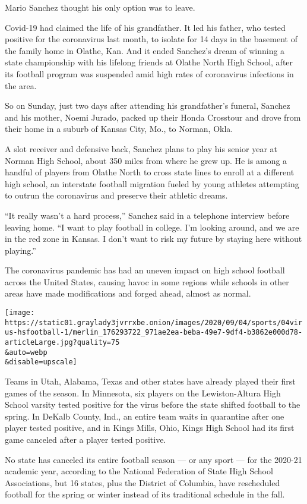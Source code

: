 Mario Sanchez thought his only option was to leave.

Covid-19 had claimed the life of his grandfather. It led his father, who
tested positive for the coronavirus last month, to isolate for 14 days
in the basement of the family home in Olathe, Kan. And it ended
Sanchez's dream of winning a state championship with his lifelong
friends at Olathe North High School, after its football program was
suspended amid high rates of coronavirus infections in the area.

So on Sunday, just two days after attending his grandfather's funeral,
Sanchez and his mother, Noemi Jurado, packed up their Honda Crosstour
and drove from their home in a suburb of Kansas City, Mo., to Norman,
Okla.

A slot receiver and defensive back, Sanchez plans to play his senior
year at Norman High School, about 350 miles from where he grew up. He is
among a handful of players from Olathe North to cross state lines to
enroll at a different high school, an interstate football migration
fueled by young athletes attempting to outrun the coronavirus and
preserve their athletic dreams.

``It really wasn't a hard process,'' Sanchez said in a telephone
interview before leaving home. ``I want to play football in college. I'm
looking around, and we are in the red zone in Kansas. I don't want to
risk my future by staying here without playing.''

The coronavirus pandemic has had an uneven impact on high school
football across the United States, causing havoc in some regions while
schools in other areas have made modifications and forged ahead, almost
as normal.

\texttt{[image: https://static01.graylady3jvrrxbe.onion/images/2020/09/04/sports/04virus-hsfootball-1/merlin\_176293722\_971ae2ea-beba-49e7-9df4-b3862e000d78-articleLarge.jpg?quality=75\\\&auto=webp\\\&disable=upscale]}

Teams in Utah, Alabama, Texas and other states have already played their
first games of the season. In Minnesota, six players on the
Lewiston-Altura High School varsity tested positive for the virus before
the state shifted football to the spring. In DeKalb County, Ind., an
entire team waits in quarantine after one player tested positive, and in
Kings Mills, Ohio, Kings High School had its first game canceled after a
player tested positive.

No state has canceled its entire football season --- or any sport ---
for the 2020-21 academic year, according to the National Federation of
State High School Associations, but 16 states, plus the District of
Columbia, have rescheduled football for the spring or winter instead of
its traditional schedule in the fall.

